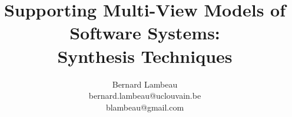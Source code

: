 \documentclass[dvips,a4paper,11pt]{report}
\begin{document}

\title{
  Supporting Multi-View Models of Software Systems: \\
  Synthesis Techniques
}
\author{Bernard Lambeau \\ bernard.lambeau@uclouvain.be \\ blambeau@gmail.com}
\maketitle


%

\tableofcontents











\end{document}
